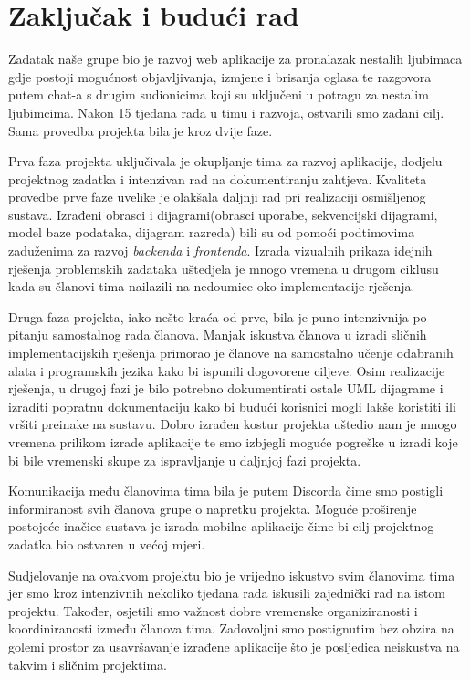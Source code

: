 \chapter{Zaključak i budući rad}

Zadatak naše grupe bio je razvoj web aplikacije za pronalazak nestalih ljubimaca gdje postoji mogućnost objavljivanja, izmjene i brisanja oglasa te razgovora putem chat-a s drugim sudionicima koji su uključeni u potragu za nestalim ljubimcima. Nakon 15 tjedana rada u timu i razvoja, ostvarili smo zadani cilj. Sama provedba projekta bila je kroz dvije faze.

Prva faza projekta uključivala je okupljanje tima za razvoj aplikacije, dodjelu projektnog zadatka i intenzivan rad na dokumentiranju zahtjeva. Kvaliteta provedbe prve faze uvelike je olakšala daljnji rad pri realizaciji osmišljenog sustava. Izrađeni obrasci i dijagrami(obrasci uporabe, sekvencijski dijagrami, model baze podataka, dijagram razreda) bili su od pomoći podtimovima zaduženima za razvoj \textit{backenda} i \textit{frontenda}. Izrada vizualnih prikaza idejnih rješenja problemskih zadataka uštedjela je mnogo vremena u drugom ciklusu kada su članovi tima nailazili na nedoumice oko implementacije rješenja.

Druga faza projekta, iako nešto kraća od prve, bila je puno intenzivnija po pitanju samostalnog rada članova. Manjak iskustva članova u izradi sličnih implementacijskih rješenja primorao je članove na samostalno učenje odabranih alata i programskih jezika kako bi ispunili dogovorene ciljeve. Osim realizacije rješenja, u drugoj fazi je bilo potrebno dokumentirati ostale UML dijagrame i izraditi popratnu dokumentaciju kako bi budući korisnici mogli lakše koristiti ili vršiti preinake na sustavu. Dobro izrađen kostur projekta uštedio nam je mnogo vremena prilikom izrade aplikacije te smo izbjegli moguće pogreške u izradi koje bi bile vremenski skupe za ispravljanje u daljnjoj fazi projekta.

Komunikacija među članovima tima bila je putem Discorda čime smo postigli informiranost svih članova grupe o napretku projekta. Moguće proširenje postojeće inačice sustava je izrada mobilne aplikacije čime bi cilj projektnog zadatka bio ostvaren u većoj mjeri.

Sudjelovanje na ovakvom projektu bio je vrijedno iskustvo svim članovima tima jer smo kroz intenzivnih nekoliko tjedana rada iskusili zajednički rad na istom projektu. Također, osjetili smo važnost dobre vremenske organiziranosti i koordiniranosti između članova tima. Zadovoljni smo postignutim bez obzira na golemi prostor za usavršavanje izrađene aplikacije što je posljedica neiskustva na takvim i sličnim projektima.

\eject